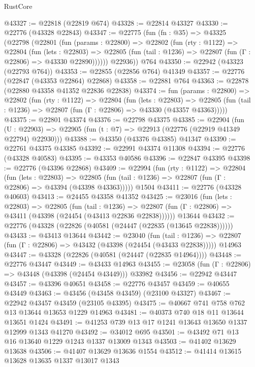 \begin{lexlean}{RustCore}
\begin{coremodule}
@43327 := @22818 (@22819 @674)
@43328 := @22814 @43327
@43330 := @22776 (@43328 @22843)
@43347 := @22775
    (fun (fn : @35) =>
    @43325
      (@22798
        (@22801
          (fun (params : @22800) =>
          @22802
            (fun (rty : @1122) =>
            @22804
              (fun (lets : @22803) =>
              @22805 (fun (tail : @1236) => @22807 (fun (Γ : @22806) => @43330 @22890))))))
        @22936))
    @764
@43350 := @22942 (@43323 (@22793 @764))
@43353 := @22855 (@22856 @764) @41349
@43357 := @22776 (@22847 (@43353 @22864) @22868)
@43358 := @22881 @764
@43363 := @22878 (@22880 @43358 @41352 @22836 @22838)
@43374 := fun (params : @22800) =>
  @22802
    (fun (rty : @1122) =>
    @22804
      (fun (lets : @22803) =>
      @22805 (fun (tail : @1236) => @22807 (fun (Γ : @22806) => @43330 (@43357 @43363)))))
@43375 := @22801 @43374
@43376 := @22798 @43375
@43385 := @22904
    (fun (U : @22903) => @22905 (fun (t : @7) => @22913 (@22776 (@22919 @41349 @22794) @22930)))
@43388 := @43350 (@43376 @43385) @41347
@43390 := @22761 @43375 @43385
@43392 := @22991 @43374 @11308
@43394 := @22776 (@43328 @40583)
@43395 := @43353 @40586
@43396 := @22847 @43395
@43398 := @22776 (@43396 @22868)
@43409 := @22994
    (fun (rty : @1122) =>
    @22804
      (fun (lets : @22803) =>
      @22805 (fun (tail : @1236) => @22807 (fun (Γ : @22806) => @43394 (@43398 @43363)))))
    @1504
@43411 := @22776 (@43328 @40603)
@43413 := @24455 @43358 @41352
@43425 := @23016
    (fun (lets : @22803) =>
    @22805
      (fun (tail : @1236) =>
      @22807 (fun (Γ : @22806) => @43411 (@43398 (@24454 (@43413 @22836 @22838))))))
    @13644
@43432 := @22776 (@43328 (@22826 (@40581 (@24447 (@22835 (@13645 @22838))))))
@43433 := @43413 @13644
@43442 := @23040
    (fun (tail : @1236) => @22807 (fun (Γ : @22806) => @43432 (@43398 (@24454 (@43433 @22838)))))
    @14963
@43447 := @43328 (@22826 (@40581 (@24447 (@22835 @14964))))
@43448 := @22776 @43447
@43449 := @43433 @14963
@43455 := @23058 (fun (Γ : @22806) => @43448 (@43398 (@24454 @43449))) @33982
@43456 := @22942 @43447
@43457 := @43396 @40651
@43458 := @22776 @43457
@43459 := @40655 @43449
@43463 := @43456 (@43458 @43459) (@23100 @43327)
@43467 := @22942 @43457 @43459 (@23105 @43395)
@43475 := @40667 @741 @758 @762 @13 @13644 @13653 @1229 @14963
@43481 := @40373 @740 @18 @11 @13644 @13651 @1424
@43491 := @41253 @739 @13 @17 @1241 @13643 @13650 @1337 @12999 @1343 @41270
@43492 := @34012 @695
@43501 := @43492 @71 @13 @16 @13640 @1229 @1243 @1337 @13009 @1343
@43503 := @41402 @13629 @13638
@43506 := @41407 @13629 @13636 @1554
@43512 := @41414 @13615 @13628 @13635 @1337 @13017 @1343

\end{coremodule}
\end{lexlean}
